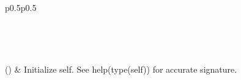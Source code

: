 \documentclass[letterpaper,10pt,english]{sphinxmanual}
\begin{document}
\begin{savenotes}\sphinxatlongtablestart\begin{longtable}[c]{p{0.5\linewidth}p{0.5\linewidth}}
\hline

\endfirsthead

%
{}\\
\hline

\endhead

\hline
{}\\
\endfoot

\endlastfoot

{\hyperref[\detokenize{autoapi/pine/pipelines/pipeline/index:pine.pipelines.pipeline.Pipeline}]{}}()
&
Initialize self.  See help(type(self)) for accurate signature.
\\
\hline
\end{longtable}\sphinxatlongtableend\end{savenotes}
\end{document}
